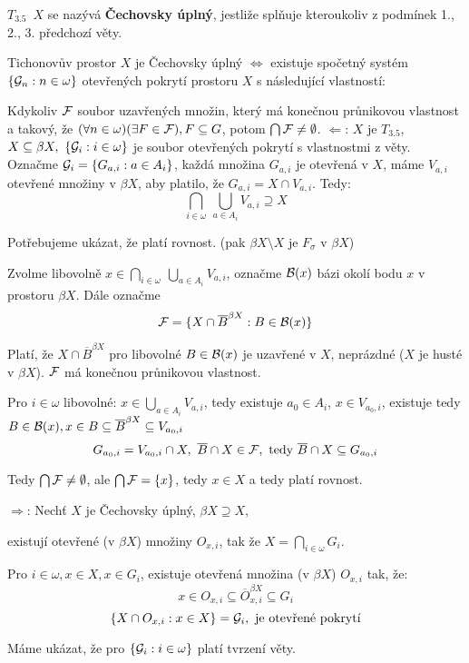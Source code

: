 \documentclass[12pt,a4paper]{article}
\newcommand\BX{\ensuremath{\beta X}}
\newcommand\Tich{$T_{3.5}$}
\newcommand\close{\overline}
\newcommand{\betaClose}[1]{\close #1 ^{\beta X}}
\begin{document}
 \Tich~$X$ se nazývá {\bf Čechovsky úplný}, jestliže splňuje
	kteroukoliv z podmínek 1., 2., 3. předchozí věty.

\veta Tichonovův prostor $X$ je Čechovsky úplný $\iff$ existuje spočetný systém
	$\{\mathcal{ G }_n: n \in \omega\}$ otevřených pokrytí prostoru $X$ s následující
	vlastností:

	Kdykoliv $\mathcal{ F }$ soubor uzavřených množin, který má konečnou průnikovou
	vlastnost a takový, že $(\forall n \in \omega) (\exists F \in \mathcal{ F }), F
	\subseteq G$, potom $\bigcap \mathcal{ F } \neq \emptyset$.
\dukaz
\noindent$\Leftarrow$: $X$ je \Tich,~$X \subseteq \beta X,~\{\mathcal{ G }_i : i \in
	\omega \}$ je soubor otevřených pokrytí s vlastnostmi z věty. Označme $\mathcal{ G }_i = \{G_{a,i} : a \in A_i\}$, každá množina $G_{a,i}$ je otevřená v $X$,
	máme $V_{a,i}$ otevřené množiny v \BX, aby platilo, že $G_{a,i} = X \cap
	V_{a,i}$. Tedy:
		$$\bigcap_{i \in \omega}~\bigcup_{a \in A_i} V_{a,i} \supseteq X$$
	
	Potřebujeme ukázat, že platí rovnost. (pak $\beta X \setminus X$ je
	$F_\sigma$ v \BX)

	Zvolme libovolně $x \in \bigcap_{i \in \omega}~\bigcup_{a \in A_i}
	V_{a,i}$, označme $\mathcal{ B }(x)$ bázi okolí bodu $x$ v prostoru \BX. Dále
	označme
		$$\p F = \{X \cap \betaClose B : B \in \p B(x)\}$$
	
	Platí, že $X \cap \betaClose B$ pro libovolné $B \in \mathcal{ B }(x)$ je
	uzavřené v $X$, neprázdné ($X$ je husté v \BX). $\mathcal{ F }$ má konečnou
	průnikovou vlastnost.

	Pro $i \in \omega$ libovolné: $x \in \bigcup_{a \in A_i} V_{a,i}$, tedy
	existuje $a_0 \in A_i$, $x \in V_{a_0,i}$, existuje tedy $B \in \p B(x), x
	\in B \subseteq \betaClose B \subseteq V_{a_0,i}$
		$$G_{a_0,i} = V_{a_0,i} \cap X,~\close B \cap X \in \p F,~
		  \text{tedy } \close B \cap X \subseteq G_{a_0,i}$$

	Tedy $\bigcap \mathcal{ F } \neq \emptyset$, ale $\bigcap \mathcal{ F } = \{x\}$, tedy $x
	\in X$ a tedy platí rovnost.


\medskip\noindent$\Rightarrow$: Nechť $X$ je Čechovsky úplný, $\beta X \supseteq X$,

	existují otevřené (v \BX) množiny $O_{x,i}$, tak že $X = \bigcap_{i \in
	\omega} G_i$.

	Pro $i \in \omega, x \in X, x \in G_i$, existuje otevřená množina (v \BX)
	$O_{x,i}$ tak, že:
		$$x \in O_{x,i} \subseteq \betaClose O_{x,i} \subseteq G_i$$
		$$\{X \cap O_{x,i} : x \in X\} = \mathcal{ G }_i,~\text{je otevřené pokrytí}$$

	Máme ukázat, že pro $\{\mathcal{ G }_i : i \in \omega \}$ platí tvrzení věty.
\end{document}
